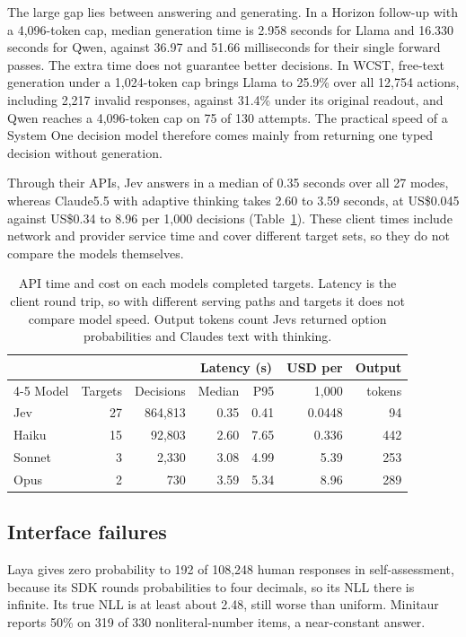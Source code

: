\documentclass[11pt,a4paper]{article}
\begin{document}
The large gap lies between answering and generating. In a Horizon follow-up with a 4,096-token cap, median generation time is 2.958 seconds for Llama and 16.330 seconds for Qwen, against 36.97 and 51.66 milliseconds for their single forward passes. The extra time does not guarantee better decisions. In WCST, free-text generation under a 1,024-token cap brings Llama to 25.9\% over all 12,754 actions, including 2,217 invalid responses, against 31.4\% under its original readout, and Qwen reaches a 4,096-token cap on 75 of 130 attempts. The practical speed of a System One decision model therefore comes mainly from returning one typed decision without generation.

Through their APIs, Jev answers in a median of 0.35 seconds over all 27 modes, whereas Claude5.5 with adaptive thinking takes 2.60 to 3.59 seconds, at US\$0.045 against US\$0.34 to 8.96 per 1,000 decisions (Table~\ref{tab:api-time-cost}). These client times include network and provider service time and cover different target sets, so they do not compare the models themselves.


\begin{table}[!h]
\centering\footnotesize
\setlength{\tabcolsep}{2.4pt}
\begin{tabular}{@{}lrrrrrr@{}}
\toprule
 & & & \multicolumn{2}{c}{Latency (s)} & USD per & Output \\
\cmidrule(lr){4-5}
Model & Targets & Decisions & Median & P95 & 1{,}000 & tokens \\
\midrule
Jev & 27 & 864{,}813 & 0.35 & 0.41 & 0.0448 & 94 \\
Haiku & 15 & 92{,}803 & 2.60 & 7.65 & 0.336 & 442 \\
Sonnet & 3 & 2{,}330 & 3.08 & 4.99 & 5.39 & 253 \\
Opus & 2 & 730 & 3.59 & 5.34 & 8.96 & 289 \\
\bottomrule
\end{tabular}
\caption{API time and cost on each model\textquotesingle{}s completed targets. Latency is the client round trip, so with different serving paths and targets it does not compare model speed. Output tokens count Jev\textquotesingle{}s returned option probabilities and Claude\textquotesingle{}s text with thinking.}
\label{tab:api-time-cost}
\vspace{-10pt}
\end{table}


\subsection{Interface failures}
\label{sec:analysis}
Laya gives zero probability to 192 of 108,248 human responses in self-assessment, because its SDK rounds probabilities to four decimals, so its NLL there is infinite. Its true NLL is at least about 2.48, still worse than uniform. Minitaur reports 50\% on 319 of 330 nonliteral-number items, a near-constant answer.
\end{document}
